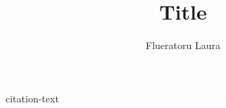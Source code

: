 \documentclass[a4paper,11pt]{article}
\begin{document}
\title{Title}
\author{Flueratoru Laura}
\date{}
\maketitle



\begin{thebibliography}{1}
   citation-text
\end{thebibliography}
\end{document}
